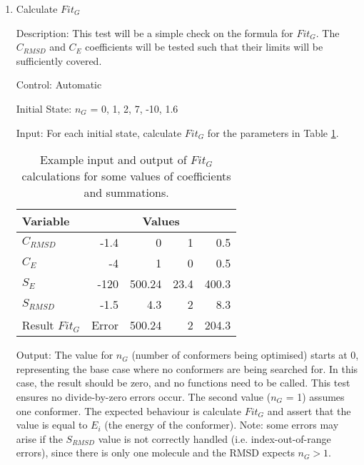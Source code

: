 \documentclass[12pt, titlepage]{article}
\begin{document}
\begin{enumerate}
	
	\item Calculate $Fit_G$
	
	Description: This test will be a simple check on the formula for $Fit_G$. 
	The $C_{RMSD}$ and $C_E$ coefficients will be tested such that their limits 
	will be sufficiently covered.
	
	Control: Automatic
	
	Initial State: $n_G$ = 0, 1, 2, 7, -10, 1.6
	
	Input: For each initial state, calculate $Fit_G$ for the parameters in 
	Table \ref{table-fitg}.

	\begin{table}[H]
		\begin{center}
		\begin{tabular}{lrrrr}
			\toprule
			Variable & \multicolumn{4}{c}{Values} \\
			\midrule
			$C_{RMSD}$ 	   & -1.4  & 0      & 1    & 0.5   \\
			$C_E$		   & -4    & 1      & 0    & 0.5   \\
			$S_E$ 		   & -120  & 500.24 & 23.4 & 400.3 \\
			$S_{RMSD}$ 	   & -1.5  & 4.3    & 2    & 8.3   \\
			\midrule
			Result $Fit_G$ & Error & 500.24 & 2    & 204.3 \\
			\bottomrule
		\end{tabular}
		\end{center}
	\caption{Example input and output of $Fit_G$ calculations for some values 
	of coefficients and summations.}
	\label{table-fitg}
	\end{table}
	
	Output: The value for $n_G$ (number of conformers being optimised) 
	starts at 0, representing the base case where no conformers are being 
	searched for. In this case, the result should be zero, and no functions 
	need to be called. This test ensures no divide-by-zero errors occur. The 
	second value ($n_G$ = 1) assumes one conformer. The expected behaviour is 
	calculate $Fit_G$ and assert that the value is equal to $E_i$ (the energy 
	of the conformer). Note: some errors may arise if the $S_{RMSD}$ value is 
	not correctly handled (i.e. index-out-of-range errors), since there is only 
	one molecule and the RMSD expects $n_G > 1$.
	

\end{enumerate}
\end{document}
